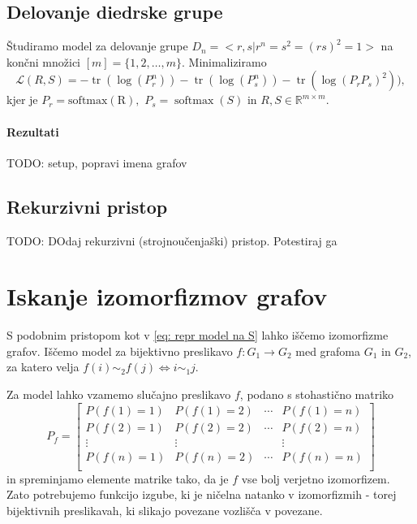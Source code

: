\documentclass[mat2, tisk]{fmfdelo}
\newcommand{\TODO}[1]{{\color{blue} TODO: #1}}
\newcommand{\R}{\mathbb R}
\newcommand{\loss }{\mathcal L}
\begin{document}
              \subsection{Delovanje diedrske grupe}
              Študiramo model za delovanje  grupe $D_n = <r,s |
              r^n=s^2=(rs)^2=1>$ na končni množici $[m] =
              \{1,2,\dotsc, m\}$. Minimaliziramo
              $$
              \loss(R, S) = - \operatorname{tr}(\log (P_r^n))
              - \operatorname{tr}(\log (P_s^n))
            - \operatorname{tr}(\log (P_rP_s)^2))
            ,
            $$
            kjer je $P_r = \operatorname{softmax(R)},$
            $P_s=\operatorname{softmax}(S)$ in    $R, S \in \R^{m \times m}$.
            \paragraph{Rezultati}
            \TODO{setup, popravi imena grafov}

            \subsection{Rekurzivni pristop}

            \TODO{DOdaj rekurzivni (strojnoučenjaški) pristop. Potestiraj ga}

            \clearpage
            \section{Iskanje izomorfizmov grafov}
            S podobnim pristopom kot v \ref{eq: repr model na S}
            lahko iščemo izomorfizme grafov. Iščemo model za
            bijektivno preslikavo $f \colon G_1 \to G_2$ med grafoma
            $G_1$ in $G_2$, za katero velja $f(i) \sim_2 f(j) \iff i \sim_1 j$.

            Za model lahko vzamemo slučajno preslikavo $f$, podano s
            stohastično matriko
            $$P_f =
            \begin{bmatrix}
              P(f(1) = 1) & P(f(1) = 2) & \dotsm & P(f(1) = n) \\
              P(f(2) = 1) & P(f(2) = 2) & \dotsm & P(f(2) = n) \\
              \vdots & \vdots & & \vdots \\
              P(f(n) = 1) & P(f(n) = 2) & \dotsm & P(f(n) = n) \\
            \end{bmatrix} $$
            in spreminjamo elemente matrike tako, da je $f $ vse bolj
            verjetno izomorfizem. Zato potrebujemo funkcijo izgube,
            ki je ničelna natanko v izomorfizmih - torej bijektivnih
            preslikavah, ki slikajo povezane vozlišča v povezane.
\end{document}

